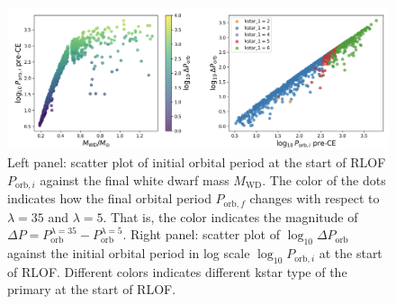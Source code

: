 \documentclass[12pt]{article}
\newcommand{\MWD}{M_{\mathrm{WD}}}
\newcommand{\Porb}{P_{\mathrm{orb}}}
\begin{document}
\begin{figure}
	\centering
	\includegraphics[width=\linewidth]{dif-kstar two plot.png}
	\caption{Left panel: scatter plot of initial orbital period at the start of RLOF $P_{\mathrm{orb}, i}$ against the final white dwarf mass $\MWD$. The color of the dots indicates how the final orbital period $P_{\mathrm{orb}, f}$ changes with respect to $\lambda=35$ and $\lambda=5$. That is, the color indicates the magnitude of $\Delta P = P_{\mathrm{orb}}^{\lambda = 35} - P_{\mathrm{orb}}^{\lambda = 5}$. Right panel: scatter plot of $\log_{10} \Delta \Porb$ against the initial orbital period in log scale $\log_{10} P_{\mathrm{orb}, i}$ at the start of RLOF. Different colors indicates different kstar type of the primary at the start of RLOF.}
	\label{dif-kstar-exp}
\end{figure}



\end{document}
